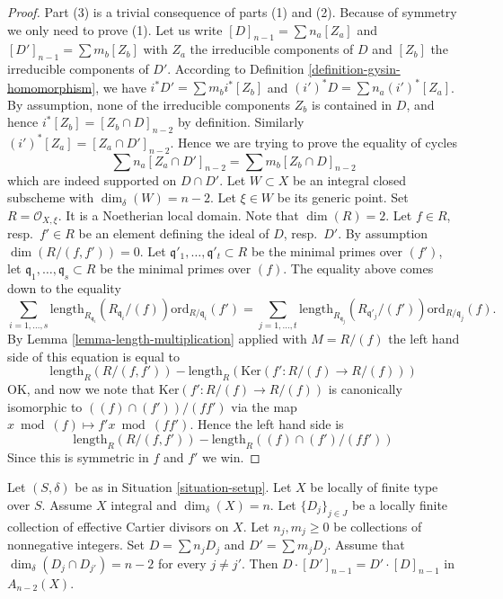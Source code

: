 \begin{proof}
Part (3) is a trivial consequence of parts (1) and (2).
Because of symmetry we only need to prove (1).
Let us write $[D]_{n - 1} = \sum n_a[Z_a]$ and
$[D']_{n - 1} = \sum m_b[Z_b]$ with $Z_a$ the irreducible
components of $D$ and $[Z_b]$ the irreducible
components of $D'$.
According to Definition \ref{definition-gysin-homomorphism},
we have $i^*D' = \sum m_b i^*[Z_b]$ and $(i')^*D = \sum n_a(i')^*[Z_a]$.
By assumption, none of the irreducible components $Z_b$
is contained in $D$, and hence $i^*[Z_b] = [Z_b\cap D]_{n - 2}$
by definition. Similarly $(i')^*[Z_a] = [Z_a \cap D']_{n - 2}$.
Hence we are trying to prove the equality of cycles
$$
\sum n_a[Z_a \cap D']_{n - 2} = \sum m_b[Z_b \cap D]_{n - 2}
$$
which are indeed supported on $D \cap D'$.
Let $W \subset X$ be an integral closed subscheme
with $\dim_\delta(W) = n - 2$. Let $\xi \in W$ be its generic point.
Set $R = \mathcal{O}_{X, \xi}$. It is a Noetherian local domain.
Note that $\dim(R) = 2$. Let $f \in R$, resp.\ $f' \in R$
be an element defining the ideal of $D$, resp.\ $D'$.
By assumption $\dim(R/(f, f')) = 0$. Let
$\mathfrak q'_1, \ldots, \mathfrak q'_t \subset R$ be the minimal
primes over $(f')$, let $\mathfrak q_1, \ldots, \mathfrak q_s \subset R$
be the minimal primes over $(f)$.
The equality above comes down to the equality
$$
\sum_{i = 1, \ldots, s}
\text{length}_{R_{\mathfrak q_i}}(R_{\mathfrak q_i}/(f))
\text{ord}_{R/\mathfrak q_i}(f')
=
\sum_{j = 1, \ldots, t}
\text{length}_{R_{\mathfrak q_j}}(R_{\mathfrak q'_j}/(f'))
\text{ord}_{R/\mathfrak q_j}(f).
$$
By Lemma \ref{lemma-length-multiplication}
applied with $M = R/(f)$ the left hand side of
this equation is equal to
$$
\text{length}_R(R/(f, f'))
-
\text{length}_R(\text{Ker}(f' : R/(f) \to R/(f)))
$$
OK, and now we note that
$\text{Ker}(f' : R/(f) \to R/(f))$ is canonically isomorphic
to $((f) \cap (f'))/(ff')$ via the map $x \bmod (f) \mapsto
f'x \bmod (ff')$. Hence the left hand side is
$$
\text{length}_R(R/(f, f'))
-
\text{length}_R((f) \cap (f')/(ff'))
$$
Since this is symmetric in $f$ and $f'$ we win.
\end{proof}

\begin{lemma}
\label{lemma-commutativity-effective-Cartier-proper-intersection-infinite}
Let $(S, \delta)$ be as in Situation \ref{situation-setup}.
Let $X$ be locally of finite type over $S$.
Assume $X$ integral and $\dim_\delta(X) = n$.
Let $\{D_j\}_{j \in J}$ be a locally finite collection of
effective Cartier divisors on $X$. Let $n_j, m_j \geq 0$ be
collections of nonnegative integers. Set
$D = \sum n_j D_j$ and $D' = \sum m_j D_j$.
Assume that $\dim_\delta(D_j \cap D_{j'}) = n - 2$ for every
$j \not = j'$. Then $D \cdot [D']_{n - 1} = D' \cdot [D]_{n - 1}$ in
$A_{n - 2}(X)$.
\end{lemma}

